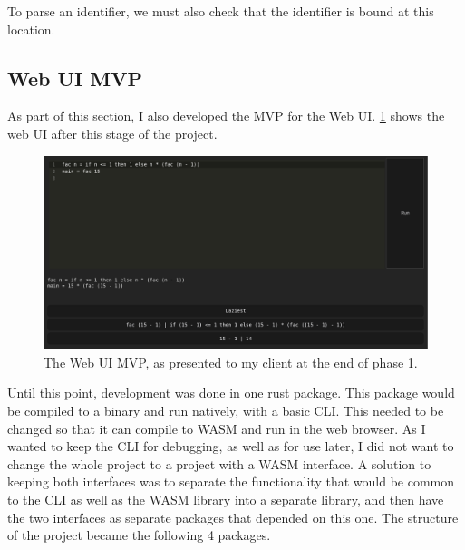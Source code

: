 To parse an identifier, we must also check that the identifier is bound at this location.

\subsection{Web UI \ac{MVP}}
As part of this section, I also developed the MVP for the Web UI. \ref{fig:screenshot_phase_1_end} shows the web UI after this stage of the project. 

\begin{figure}[h]
    \centering
    \includegraphics[width=1\linewidth]{images/phase-1-end.png} 
    \captionsetup{justification=centering}
    \caption{The Web UI \ac{MVP}, as presented to my client at the end of phase 1.}
    \label{fig:screenshot_phase_1_end}
\end{figure}

Until this point, development was done in one rust package. This package would be compiled to a binary and run natively, with a basic \ac{CLI}. This needed to be changed so that it can compile to \ac{WASM} and run in the web browser. As I wanted to keep the \ac{CLI} for debugging, as well as for use later, I did not want to change the whole project to a project with a \ac{WASM} interface. A solution to keeping both interfaces was to separate the functionality that would be common to the \ac{CLI} as well as the \ac{WASM} library into a separate library, and then have the two interfaces as separate packages that depended on this one. The structure of the project became the following 4 packages. 

